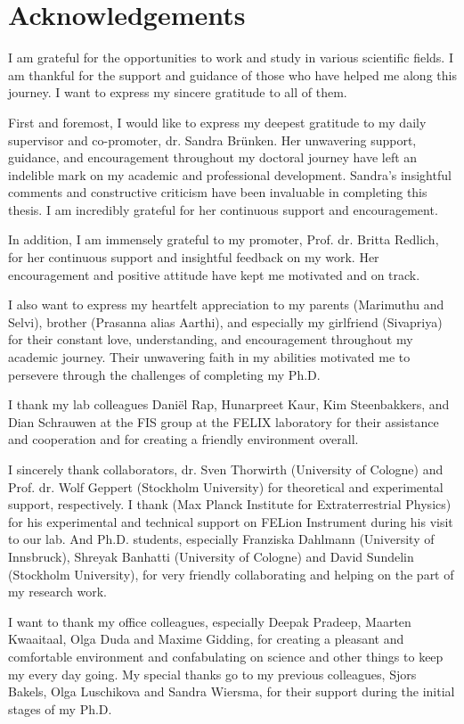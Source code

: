 \chapter{Acknowledgements}
\label{acknowledgements}

I am grateful for the opportunities to work and study in various scientific fields. I am thankful for the support and guidance of those who have helped me along this journey. I want to express my sincere gratitude to all of them.

First and foremost, I would like to express my deepest gratitude to my daily supervisor and co-promoter, dr. Sandra Br\"{u}nken. Her unwavering support, guidance, and encouragement throughout my doctoral journey have left an indelible mark on my academic and professional development. 
Sandra's insightful comments and constructive criticism have been invaluable in completing this thesis. I am incredibly grateful for her continuous support and encouragement.

In addition, I am immensely grateful to my promoter, Prof. dr. Britta Redlich, for her continuous support and insightful feedback on my work. Her encouragement and positive attitude have kept me motivated and on track.

I also want to express my heartfelt appreciation to my parents (Marimuthu and Selvi), brother (Prasanna alias Aarthi), and especially my girlfriend (Sivapriya) for their constant love, understanding, and encouragement throughout my academic journey. Their unwavering faith in my abilities motivated me to persevere through the challenges of completing my Ph.D.

I thank my lab colleagues Dani\"{e}l Rap, Hunarpreet Kaur, Kim Steenbakkers, and Dian Schrauwen at the FIS group at the FELIX laboratory for their assistance and cooperation and for creating a friendly environment overall.

I sincerely thank collaborators, dr. Sven Thorwirth (University of Cologne) and Prof. dr. Wolf Geppert (Stockholm University) for theoretical and experimental support, respectively. I thank  (Max Planck Institute for Extraterrestrial Physics) for his experimental and technical support on FELion Instrument during his visit to our lab.  And Ph.D. students, especially Franziska Dahlmann (University of Innsbruck), Shreyak Banhatti (University of Cologne) and David Sundelin (Stockholm University), for very friendly collaborating and helping on the part of my research work.

 I want to thank my office colleagues, especially Deepak Pradeep, Maarten Kwaaitaal, Olga Duda and Maxime Gidding, for creating a pleasant and comfortable environment and confabulating on science and other things to keep my every day going. My special thanks go to my previous colleagues, Sjors Bakels, Olga Luschikova and Sandra Wiersma, for their support during the initial stages of my Ph.D.

